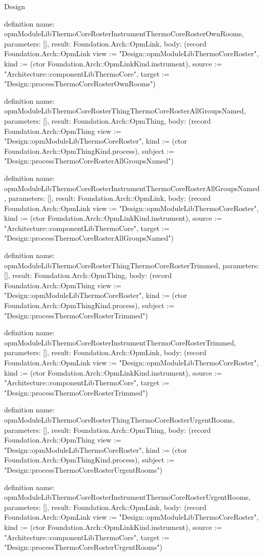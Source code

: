 \begin{lexlean}{Design}
\begin{semanticmodule}
definition{
  name: opmModuleLibThermoCoreRosterInstrumentThermoCoreRosterOwnRooms,
  parameters: [],
  result: Foundation.Arch::OpmLink,
  body: (record Foundation.Arch::OpmLink {view := "Design::opmModuleLibThermoCoreRoster", kind := (ctor Foundation.Arch::OpmLinkKind.instrument), source := "Architecture::componentLibThermoCore", target := "Design::processThermoCoreRosterOwnRooms"})
}

definition{
  name: opmModuleLibThermoCoreRosterThingThermoCoreRosterAllGroupsNamed,
  parameters: [],
  result: Foundation.Arch::OpmThing,
  body: (record Foundation.Arch::OpmThing {view := "Design::opmModuleLibThermoCoreRoster", kind := (ctor Foundation.Arch::OpmThingKind.process), subject := "Design::processThermoCoreRosterAllGroupsNamed"})
}

definition{
  name: opmModuleLibThermoCoreRosterInstrumentThermoCoreRosterAllGroupsNamed,
  parameters: [],
  result: Foundation.Arch::OpmLink,
  body: (record Foundation.Arch::OpmLink {view := "Design::opmModuleLibThermoCoreRoster", kind := (ctor Foundation.Arch::OpmLinkKind.instrument), source := "Architecture::componentLibThermoCore", target := "Design::processThermoCoreRosterAllGroupsNamed"})
}

definition{
  name: opmModuleLibThermoCoreRosterThingThermoCoreRosterTrimmed,
  parameters: [],
  result: Foundation.Arch::OpmThing,
  body: (record Foundation.Arch::OpmThing {view := "Design::opmModuleLibThermoCoreRoster", kind := (ctor Foundation.Arch::OpmThingKind.process), subject := "Design::processThermoCoreRosterTrimmed"})
}

definition{
  name: opmModuleLibThermoCoreRosterInstrumentThermoCoreRosterTrimmed,
  parameters: [],
  result: Foundation.Arch::OpmLink,
  body: (record Foundation.Arch::OpmLink {view := "Design::opmModuleLibThermoCoreRoster", kind := (ctor Foundation.Arch::OpmLinkKind.instrument), source := "Architecture::componentLibThermoCore", target := "Design::processThermoCoreRosterTrimmed"})
}

definition{
  name: opmModuleLibThermoCoreRosterThingThermoCoreRosterUrgentRooms,
  parameters: [],
  result: Foundation.Arch::OpmThing,
  body: (record Foundation.Arch::OpmThing {view := "Design::opmModuleLibThermoCoreRoster", kind := (ctor Foundation.Arch::OpmThingKind.process), subject := "Design::processThermoCoreRosterUrgentRooms"})
}

definition{
  name: opmModuleLibThermoCoreRosterInstrumentThermoCoreRosterUrgentRooms,
  parameters: [],
  result: Foundation.Arch::OpmLink,
  body: (record Foundation.Arch::OpmLink {view := "Design::opmModuleLibThermoCoreRoster", kind := (ctor Foundation.Arch::OpmLinkKind.instrument), source := "Architecture::componentLibThermoCore", target := "Design::processThermoCoreRosterUrgentRooms"})
}


\end{semanticmodule}
\end{lexlean}
